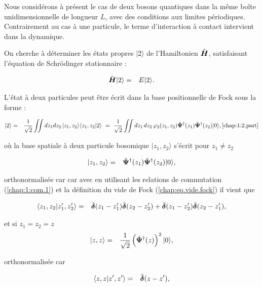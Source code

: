 Nous considérons à présent le cas de deux bosons quantiques dans la même boîte unidimensionnelle de longueur \(L\), avec des conditions aux limites périodiques. Contrairement au cas à une particule, le terme d’interaction à contact intervient dans la dynamique.

On cherche à déterminer les états propres \(\vert 2 \rangle\) de l’Hamiltonien \(\hat{\bm{H}}\), satisfaisant l’équation de Schrödinger stationnaire :

\begin{eqnarray}
	\hat{\bm{H}} \vert 2 \rangle & = & E \vert 2 \rangle.
\end{eqnarray}


L’état à deux particules peut être écrit dans la base positionnelle de Fock sous la forme :

\begin{eqnarray}
	\vert 2 \rangle & = & \frac{1}{\sqrt{2}}\iint dz_1dz_2 \, \vert z_1 , z_2 \rangle \langle z_1 , z_2  \vert 2  \rangle ~=~\frac{1}{\sqrt{2}} \iint dz_1\,dz_2 \, \varphi_2(z_1, z_2) \hat{\bm{\Psi}}^\dag(z_1) \hat{\bm{\Psi}}^\dag(z_2) \vert 0 \rangle, \ref{chap:1:2.part}
\end{eqnarray}

où la base spatiale à deux particule bosomique $\vert z_1 , z_2 \rangle$ s'écrit pour $z_1 \neq  z_2$

\begin{eqnarray}
	\vert z_1 , z_2 \rangle  & = &  \hat{\bm{\Psi}}^\dag(z_1) \hat{\bm{\Psi}}^\dag(z_2) \vert 0 \rangle ,
\end{eqnarray}

orthonormalisée car car avec en utilisant les relations de commutation (\ref{chap:1:com.1})  et la définition du vide de Fock (\ref{chap:eq.vide.fock}) il vient que 

\begin{eqnarray}
	\langle z_1 , z_2 \vert z_1' , z_2' \rangle  & = & \hat{\bm{\delta}}(z_1 -z_1')\hat{\bm{\delta}}(z_2 -z_2')  +   \hat{\bm{\delta}}(z_1 -z_2')\hat{\bm{\delta}}(z_2 -z_1'),
\end{eqnarray}

et si $z_1 =  z_2 = z$
\begin{eqnarray}
	\vert z , z \rangle  & = &  \frac{1}{\sqrt{2}} \left(\hat{\bm{\Psi}}^\dag(z)\right)^2  \vert 0 \rangle ,
\end{eqnarray}

orthonormalisée car 

\begin{eqnarray}
	\langle z , z \vert z' , z' \rangle  & = & \hat{\bm{\delta}}(z -z'),
\end{eqnarray}


